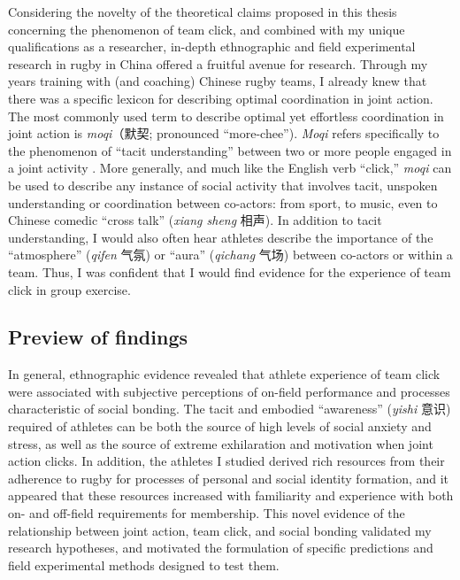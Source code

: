 \begin{CJK}{UTF8}{gbsn}
Considering the novelty of the theoretical claims proposed in this thesis concerning the phenomenon of team click, and combined with my unique qualifications as a researcher, in-depth ethnographic and field experimental research in rugby in China offered a fruitful avenue for research.  Through my years training with (and coaching) Chinese rugby teams, I already knew that there was a specific lexicon for describing optimal coordination in joint action.  The most commonly used term to describe optimal yet effortless coordination in joint action is \textit{moqi}（默契; pronounced ``more-chee'').  \textit{Moqi} refers specifically to the phenomenon of ``tacit understanding'' between two or more people engaged in a joint activity \citep{Pleco2018}. More generally, and much like the English verb ``click,'' \textit{moqi} can be used to describe any instance of social activity that involves tacit, unspoken understanding or coordination between co-actors: from sport, to music, even to Chinese comedic ``cross talk'' (\textit{xiang sheng} 相声).  In addition to tacit understanding, I would also often hear athletes describe the importance of the ``atmosphere'' (\textit{qifen} 气氛) or ``aura'' (\textit{qichang} 气场) between co-actors or within a team.  Thus, I was confident that I would find evidence for the experience of team click in group exercise.

\subsection{Preview of findings}
In general, ethnographic evidence revealed that athlete experience of team click were associated with subjective perceptions of on-field performance and processes characteristic of social bonding.  The tacit and embodied ``awareness'' (\textit{yishi} 意识) required of athletes can be both the source of high levels of social anxiety and stress, as well as the source of extreme exhilaration and motivation when joint action clicks.  In addition, the athletes I studied derived rich resources from their adherence to rugby for processes of personal and social identity formation, and it appeared that these resources increased with familiarity and experience with both on- and off-field requirements for membership.  This novel evidence of the relationship between joint action, team click, and social bonding validated my research hypotheses, and motivated the formulation of specific predictions and field experimental methods designed to test them.


\end{CJK}
